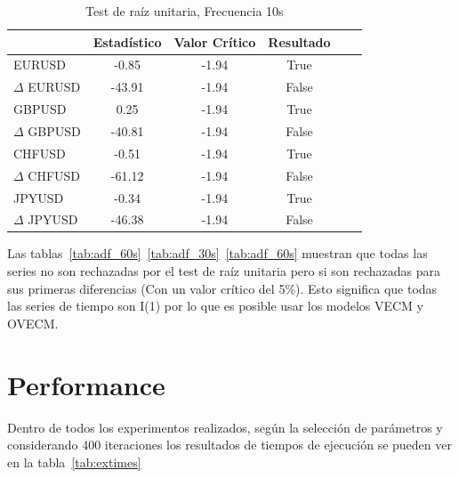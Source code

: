 \begin{table}[h!]
\caption{Test de raíz unitaria, Frecuencia 10s}
\label{tab:adf_10s}
\begin{center}
\begin{tabular}{|l|c|c|c|c|c|}
\hline
& \textbf{Estadístico} & \textbf{Valor Crítico} & \textbf{Resultado}\\
\hline
EURUSD          & -0.85 & -1.94 & True       \\
$\Delta$ EURUSD & -43.91   & -1.94 & False       \\
GBPUSD          & 0.25   & -1.94 & True          \\
$\Delta$ GBPUSD & -40.81   & -1.94 & False       \\
CHFUSD          & -0.51   & -1.94 & True         \\
$\Delta$ CHFUSD & -61.12   & -1.94 & False       \\
JPYUSD          & -0.34 & -1.94 & True        \\
$\Delta$ JPYUSD & -46.38 & -1.94 & False     \\ 
\hline
\end{tabular}
\end{center}
\end{table}

Las tablas~\ref{tab:adf_60s}~\ref{tab:adf_30s}~\ref{tab:adf_60s} muestran que
todas las series no son rechazadas por el test de raíz unitaria pero si son
rechazadas para sus primeras diferencias (Con un valor crítico del 5\%). Esto
significa que todas las series de tiempo son I(1) por lo que es posible usar
los modelos VECM y OVECM. 

\section{Performance}
Dentro de todos los experimentos realizados, según la selección de parámetros
y considerando 400 iteraciones los resultados de tiempos de ejecución se pueden
ver en la tabla~\ref{tab:extimes}

